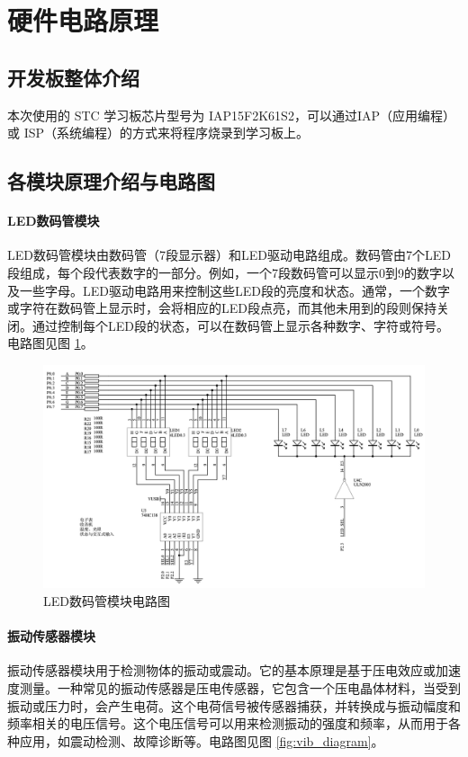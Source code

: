 \documentclass{article}
\begin{document}
\section{硬件电路原理}

\subsection{开发板整体介绍}

本次使用的 STC 学习板芯片型号为 IAP15F2K61S2，可以通过IAP（应用编程） 或 ISP（系统编程）的方式来将程序烧录到学习板上。

\subsection{各模块原理介绍与电路图}

\paragraph{LED数码管模块}
LED数码管模块由数码管（7段显示器）和LED驱动电路组成。数码管由7个LED段组成，每个段代表数字的一部分。例如，一个7段数码管可以显示0到9的数字以及一些字母。LED驱动电路用来控制这些LED段的亮度和状态。通常，一个数字或字符在数码管上显示时，会将相应的LED段点亮，而其他未用到的段则保持关闭。通过控制每个LED段的状态，可以在数码管上显示各种数字、字符或符号。电路图见图 \ref{fig:led_diagram}。

\begin{figure}[h]
    \centering
    \includegraphics[width=\textwidth]{led_diagram}
    \caption{LED数码管模块电路图}
    \label{fig:led_diagram}
\end{figure}

\paragraph{振动传感器模块}
振动传感器模块用于检测物体的振动或震动。它的基本原理是基于压电效应或加速度测量。一种常见的振动传感器是压电传感器，它包含一个压电晶体材料，当受到振动或压力时，会产生电荷。这个电荷信号被传感器捕获，并转换成与振动幅度和频率相关的电压信号。这个电压信号可以用来检测振动的强度和频率，从而用于各种应用，如震动检测、故障诊断等。电路图见图 \ref{fig:vib_diagram}。
\end{document}

